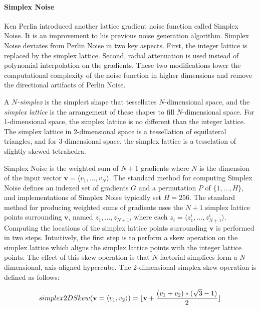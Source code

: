 \documentclass[12pt]{article}
\theoremstyle{definition}
\theoremstyle{remark}
\DeclarePairedDelimiter\floor{\lfloor}{\rfloor}
\begin{document}
\paragraph{Simplex Noise}

Ken Perlin\cite{perlin2001,gustavson2005} introduced another lattice gradient noise function called Simplex Noise. It is an improvement to his previous noise generation algorithm. Simplex Noise deviates from Perlin Noise in two key aspects. First, the integer lattice is replaced by the simplex lattice. Second, radial attenuation is used instead of polynomial interpolation on the gradients. These two modifications lower the computational complexity of the noise function in higher dimensions and remove the directional artifacts of Perlin Noise.

A \textit{$N$-simplex} is the simplest shape that tessellates $N$-dimensional space, and the \textit{simplex lattice} is the arrangement of these shapes to fill $N$-dimensional space. For 1-dimensional space, the simplex lattice is no different than the integer lattice. The simplex lattice in 2-dimensional space is a tessellation of equilateral triangles, and for 3-dimensional space, the simplex lattice is a tesselation of slightly skewed tetrahedra.

Simplex Noise is the weighted sum of $N+1$ gradients where $N$ is the dimension of the input vector $\textbf{v}=\langle v_1, ..., v_N\rangle$. The standard method for computing Simplex Noise defines an indexed set of gradients $G$ and a permutation $P$ of $\{1, ..., H\}$, and implementations of Simplex Noise typically set $H=256$. The standard method for producing weighted sums of gradients uses the $N+1$ simplex lattice points surrounding $\textbf{v}$, named $z_1, ..., z_{N+1}$, where each $z_i = \langle z^i_1, ..., z^i_{N+1}\rangle$. Computing the locations of the simplex lattice points surrounding $\textbf{v}$ is performed in two steps. Intuitively, the first step is to perform a skew operation on the simplex lattice which aligns the simplex lattice points with the integer lattice points. The effect of this skew operation is that $N$ factorial simplices form a $N$-dimensional, axis-aligned hypercube. The 2-dimensional simplex skew operation is defined as follows:

\begin{equation*}
	simplex2DSkew(\textbf{v}=\langle v_1, v_2 \rangle) = \floor{\textbf{v} + \frac{(v_1 + v_2) * (\sqrt{3} - 1)}{2}}
\end{equation*}
\end{document}
